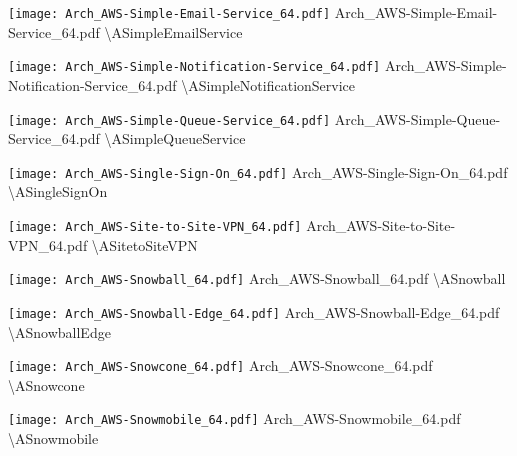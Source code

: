  {\texttt{[image: Arch\_AWS-Simple-Email-Service\_64.pdf]}} {Arch\_AWS-Simple-Email-Service\_64.pdf} {{\textbackslash}ASimpleEmailService}

 {\texttt{[image: Arch\_AWS-Simple-Notification-Service\_64.pdf]}} {Arch\_AWS-Simple-Notification-Service\_64.pdf} {{\textbackslash}ASimpleNotificationService}

 {\texttt{[image: Arch\_AWS-Simple-Queue-Service\_64.pdf]}} {Arch\_AWS-Simple-Queue-Service\_64.pdf} {{\textbackslash}ASimpleQueueService}

 {\texttt{[image: Arch\_AWS-Single-Sign-On\_64.pdf]}} {Arch\_AWS-Single-Sign-On\_64.pdf} {{\textbackslash}ASingleSignOn}

 {\texttt{[image: Arch\_AWS-Site-to-Site-VPN\_64.pdf]}} {Arch\_AWS-Site-to-Site-VPN\_64.pdf} {{\textbackslash}ASitetoSiteVPN}

 {\texttt{[image: Arch\_AWS-Snowball\_64.pdf]}} {Arch\_AWS-Snowball\_64.pdf} {{\textbackslash}ASnowball}

 {\texttt{[image: Arch\_AWS-Snowball-Edge\_64.pdf]}} {Arch\_AWS-Snowball-Edge\_64.pdf} {{\textbackslash}ASnowballEdge}

 {\texttt{[image: Arch\_AWS-Snowcone\_64.pdf]}} {Arch\_AWS-Snowcone\_64.pdf} {{\textbackslash}ASnowcone}

 {\texttt{[image: Arch\_AWS-Snowmobile\_64.pdf]}} {Arch\_AWS-Snowmobile\_64.pdf} {{\textbackslash}ASnowmobile}

